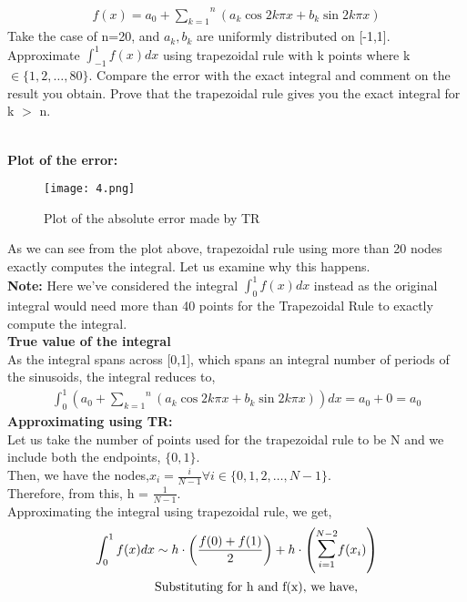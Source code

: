 \documentclass[letterpaper]{exam}
\begin{document}
\begin{questions}
\begin{align*}
    f(x) = a_0 + \overset{n}{\underset{k=1}{\sum}}\left(a_k \cos{2k\pi x} + b_k \sin{2k \pi x}\right)
\end{align*}
Take the case of n=20, and $a_k,b_k$ are uniformly distributed on [-1,1]. Approximate $\int_{-1}^{1} f(x) dx$ using trapezoidal rule with k points where k $\in \{1,2, \ldots, 80\}$. Compare the error with the exact integral and comment on the result you obtain. Prove that the trapezoidal rule gives you the exact integral for k $>$ n.
\begin{solution}
\\
\textbf{Plot of the error:}\\
\begin{figure}[H]
\centering
\texttt{[image: 4.png]}
\label{fig:Question 4}
\caption{Plot of the absolute error made by TR}
\end{figure}
As we can see from the plot above, trapezoidal rule using more than 20 nodes exactly computes the integral. Let us examine why this happens.\\
\textbf{Note:} Here we've considered the integral $\int_{0}^{1} f(x) dx$ instead as the original integral would need more than 40 points for the Trapezoidal Rule to exactly compute the integral.\\
\textbf{True value of the integral}\\
As the integral spans across [0,1], which spans an integral number of periods of the sinusoids, the integral reduces to,
\begin{align*}
   \int_{0}^{1}\left( a_0 + \overset{n}{\underset{k=1}{\sum}}\left(a_k \cos{2k\pi x} + b_k \sin{2k \pi x}\right)\right) dx = a_0 + 0 = a_0
\end{align*}
\textbf{Approximating using TR:}\\
Let us take the number of points used for the trapezoidal rule to be N and we include both the endpoints, $\{0,1\}$.\\
Then, we have the nodes,$x_i = \frac{i}{N-1} \forall i \in \{0,1,2,\ldots,N-1\}$.\\
Therefore, from this, h = $\frac{1}{N-1}$.\\
Approximating the integral using trapezoidal rule, we get,
\begin{align*}
    \int_{0}^{1} f(x) dx &\sim h \cdot \left(\frac{f(0) + f(1)}{2}\right) + h \cdot \left( \overset{N-2}{\underset{i = 1}{\mathlarger{\mathlarger{\sum}}}} f(x_i)\right)\\
    &\text{Substituting for h and f(x), we have,}\\

\end{align*}
\end{solution}
\end{questions}
\end{document}
